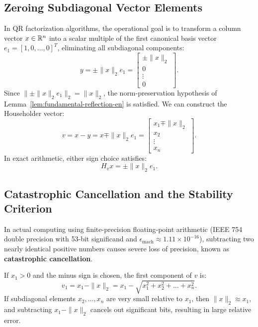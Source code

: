 \subsection{Zeroing Subdiagonal Vector Elements}
In QR factorization algorithms, the operational goal is to transform a column vector $x \in \mathbb{R}^n$ into a scalar multiple of the first canonical basis vector $e_1 = [1, 0, \dots, 0]^T$, eliminating all subdiagonal components:
\begin{equation}
    y = \pm \|x\|_2 e_1 = \begin{bmatrix} \pm \|x\|_2 \\ 0 \\ \vdots \\ 0 \end{bmatrix}.
\end{equation}
Since $\|\pm \|x\|_2 e_1\|_2 = \|x\|_2$, the norm-preservation hypothesis of Lemma~\ref{lem:fundamental-reflection-en} is satisfied. We can construct the Householder vector:
\begin{equation}
    v = x - y = x \mp \|x\|_2 e_1 = \begin{bmatrix} x_1 \mp \|x\|_2 \\ x_2 \\ \vdots \\ x_n \end{bmatrix}.
\end{equation}
In exact arithmetic, either sign choice satisfies:
\begin{equation}
    H_v x = \pm \|x\|_2 e_1.
\end{equation}

\subsection{Catastrophic Cancellation and the Stability Criterion}
In actual computing using finite-precision floating-point arithmetic (IEEE 754 double precision with 53-bit significand and $\epsilon_{\text{mach}} \approx 1.11 \times 10^{-16}$), subtracting two nearly identical positive numbers causes severe loss of precision, known as \textbf{catastrophic cancellation}.

If $x_1 > 0$ and the minus sign is chosen, the first component of $v$ is:
\begin{equation}
    v_1 = x_1 - \|x\|_2 = x_1 - \sqrt{x_1^2 + x_2^2 + \dots + x_n^2}.
\end{equation}
If subdiagonal elements $x_2, \dots, x_n$ are very small relative to $x_1$, then $\|x\|_2 \approx x_1$, and subtracting $x_1 - \|x\|_2$ cancels out significant bits, resulting in large relative error.


